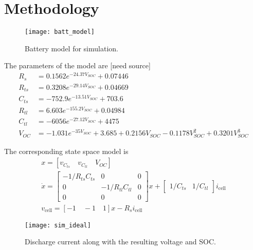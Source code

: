 \chapter{Methodology}


\begin{figure}
\centering
\texttt{[image: batt\_model]}
\caption{Battery model for simulation.}
\label{fig:batt_model}
\end{figure}

The parameters of the model are [need source]
\begin{align}
	R_s &= 0.1562 e^{-24.37 V_{SOC}} + 0.07446 \\
	R_{ts} &= 0.3208 e^{-29.14 V_{SOC}} + 0.04669 \\
	C_{ts} &= -752.9 e^{-13.51 V_{SOC}} + 703.6 \\
	R_{tl} &= 6.603 e^{-155.2 V_{SOC}} + 0.04984 \\
	C_{tl} &= -6056 e^{-27.12 V_{SOC}} + 4475 \\
	V_{OC} &= -1.031 e^{-35 V_{SOC}} + 3.685 + 0.2156 V_{SOC} - 0.1178 V_{SOC}^2 + 0.3201 V_{SOC}^3
\end{align}

The corresponding state space model is
\begin{gather}
	x = \left[ v_{C_{ts}} \quad v_{C_{tl}} \quad V_{OC} \right] \\
	\dot{x} = \begin{bmatrix}
		-1/R_{ts}C_{ts} & 0 & 0 \\
		0 & -1/R_{tl}C_{tl} & 0 \\
		0 & 0 & 0
		\end{bmatrix} x 
		+ \begin{bmatrix} 1/C_{ts} & 1/C_{tl} \end{bmatrix} i_\text{cell} \\
	v_\text{cell} = [-1 \quad -1 \quad 1] x - R_s i_\text{cell}
\end{gather}

\begin{figure}
\centering
\texttt{[image: sim\_ideal]}
\caption{Discharge current along with the resulting voltage and SOC.}
\label{fig:idealsim}
\end{figure}
